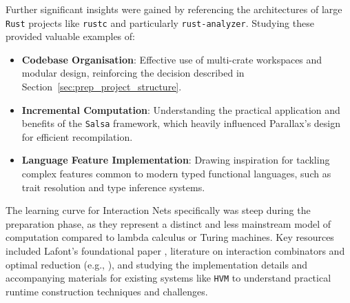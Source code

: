 Further significant insights were gained by referencing the architectures of large \texttt{Rust} projects like \texttt{rustc} and particularly \texttt{rust-analyzer}. Studying these provided valuable examples of:
\begin{itemize}
    \item \textbf{Codebase Organisation}: Effective use of multi-crate workspaces and modular design, reinforcing the decision described in Section~\ref{sec:prep_project_structure}.
    \item \textbf{Incremental Computation}: Understanding the practical application and benefits of the \texttt{Salsa} framework, which heavily influenced Parallax's design for efficient recompilation.
    \item \textbf{Language Feature Implementation}: Drawing inspiration for tackling complex features common to modern typed functional languages, such as trait resolution and type inference systems.
\end{itemize}

The learning curve for Interaction Nets specifically was steep during the preparation phase, as they represent a distinct and less mainstream model of computation compared to lambda calculus or Turing machines. Key resources included Lafont's foundational paper \cite{lafont1990interactionnets}, literature on interaction combinators and optimal reduction (e.g., \cite{mazza}), and studying the implementation details and accompanying materials for existing systems like \texttt{HVM} \cite{HVMGithub} to understand practical runtime construction techniques and challenges.

